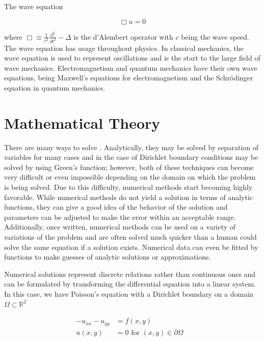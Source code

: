 \documentclass[10pt,a4paper]{article}
\begin{document}
The wave equation

\begin{equation}
\Box u = 0 \label{eqn: wave}
\end{equation}

where $\Box \equiv \frac{1}{c^2} \frac{\partial^2}{\partial t^2} - \Delta$ is the d'Alembert operator with $c$ being the wave speed. The wave equation has usage throughout physics. In classical mechanics, the wave equation is used to represent oscillations and is the start to the large field of wave mechanics. Electromagnetism and quantum mechanics have their own wave equations, being Maxwell's equations for electromagnetism and the Schr{\"o}dinger equation in quantum mechanics.

\section*{Mathematical Theory}
There are many ways to solve . Analytically, they may be solved by separation of variables for many cases and in the case of Dirichlet boundary conditions may be solved by using Green's function; however, both of these techniques can become very difficult or even impossible depending on the domain on which the problem is being solved. Due to this difficulty, numerical methods start becoming highly favorable. While numerical methods do not yield a solution in terms of analytic functions, they can give a good idea of the behavior of the solution and parameters can be adjusted to make the error within an acceptable range. Additionally, once written, numerical methods can be used on a variety of variations of the problem and are often solved much quicker than a human could solve the same equation if a solution exists. Numerical data can even be fitted by functions to make guesses of analytic solutions or approximations.

Numerical solutions represent discrete relations rather than continuous ones and can be formulated by transforming the differential equation into a linear system. In this case, we have Poisson's equation with a Dirichlet boundary on a domain $\Omega \subset \mathbb{R}^2$

\begin{subequations}
  \begin{align}
  -u_{xx} - u_{yy} &= f(x, y) & \\
  u(x, y) &= 0 \,\, \text{for} \,\, (x, y) \in \partial \Omega
  \end{align}
\end{subequations}
\end{document}
